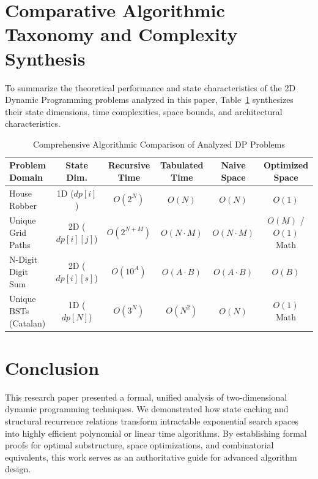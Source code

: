 \documentclass[10pt,journal,compsoc,onecolumn]{IEEEtran}
\begin{document}
\section{Comparative Algorithmic Taxonomy and Complexity Synthesis}
\label{sec:comparative-analysis}

To summarize the theoretical performance and state characteristics of the 2D Dynamic Programming problems analyzed in this paper, Table~\ref{tab:dp-comparison} synthesizes their state dimensions, time complexities, space bounds, and architectural characteristics.

\begin{table}[htbp]
\centering
\caption{Comprehensive Algorithmic Comparison of Analyzed DP Problems}
\label{tab:dp-comparison}
\begin{tabular}{lccccc}
\toprule
\textbf{Problem Domain} & \textbf{State Dim.} & \textbf{Recursive Time} & \textbf{Tabulated Time} & \textbf{Naive Space} & \textbf{Optimized Space} \\
\midrule
House Robber & 1D ($dp[i]$) & $O(2^N)$ & $O(N)$ & $O(N)$ & $O(1)$ \\
Unique Grid Paths & 2D ($dp[i][j]$) & $O(2^{N+M})$ & $O(N \cdot M)$ & $O(N \cdot M)$ & $O(M)$ / $O(1)$ Math \\
N-Digit Digit Sum & 2D ($dp[i][s]$) & $O(10^A)$ & $O(A \cdot B)$ & $O(A \cdot B)$ & $O(B)$ \\
Unique BSTs (Catalan) & 1D ($dp[N]$) & $O(3^N)$ & $O(N^2)$ & $O(N)$ & $O(1)$ Math \\
\bottomrule
\end{tabular}
\end{table}

\section{Conclusion}
\label{sec:conclusion}

This research paper presented a formal, unified analysis of two-dimensional dynamic programming techniques. We demonstrated how state caching and structural recurrence relations transform intractable exponential search spaces into highly efficient polynomial or linear time algorithms. By establishing formal proofs for optimal substructure, space optimizations, and combinatorial equivalents, this work serves as an authoritative guide for advanced algorithm design.
\end{document}
